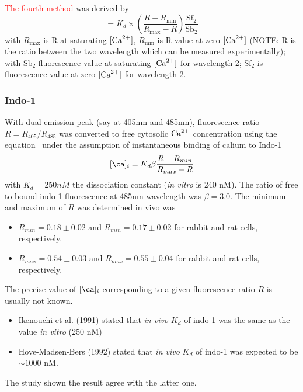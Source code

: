 \textcolor{red}{The fourth method} was derived by \citep{rudolf2003} 
\begin{equation}
[\Ca] = K_d \times (\frac{R-R_\min}{R_\max-R}) \frac{\text{Sf}_2}{\text{Sb}_2}
\end{equation}
with $R_\max$ is R at saturating $[{\text{Ca}^{2+}}]$, $R_\min$ is R value at zero $[{\text{Ca}^{2+}}]$
(NOTE: R is the ratio between the two wavelength which can be measured
experimentally); with $\text{Sb}_2$ fluorescence value at saturating $[{\text{Ca}^{2+}}]$ for
wavelength 2; $\text{Sf}_2$ is fluorescence value at zero $[{\text{Ca}^{2+}}]$ for wavelength 2.

\subsubsection{Indo-1}
\label{sec:calibrate_Indo-1}

With dual emission peak (say at 405nm and 485nm), fluorescence ratio
$R=R_{405}/R_{485}$ was converted to free cytosolic ${\text{Ca}^{2+}}$ concentration using
the equation~\citep{grynkiewicz1985}  under the assumption of instantaneous
binding of calium to Indo-1
\begin{equation}
  \label{eq:965}
  [\ca]_i = K_d \beta \frac{R-R_{min}}{R_{max}-R}
\end{equation}
with $K_d=250 nM$ the dissociation constant ({\it in vitro} is 240
nM). The ratio of free to bound indo-1 fluorescence at 485nm
wavelength was $\beta=3.0$. The minimum and maximum of $R$ was
determined in vivo was~\citep{bassani1994rir}
\begin{itemize}
\item $R_{min}=0.18\pm 0.02$ and $R_{min}=0.17\pm 0.02$ for rabbit and
  rat cells, respectively.

\item $R_{max}=0.54\pm 0.03$ and $R_{max}=0.55\pm 0.04$ for rabbit and
  rat cells, respectively.
\end{itemize}

\begin{framed}
  The precise value of $[\ca]_i$ corresponding to a given fluorescence
  ratio $R$ is usually not known.
  \begin{itemize}
  \item Ikenouchi et al. (1991) stated that {\it in vivo} $K_d$ of
    indo-1 was the same as the value {\it in vitro} (250 nM)
  \item Hove-Madsen-Bers (1992) stated that {\it in vivo} $K_d$ of
    indo-1 was expected to be $\sim 1000$ nM.
  \end{itemize}
  The study shown the result agree with the latter one.
\end{framed}

